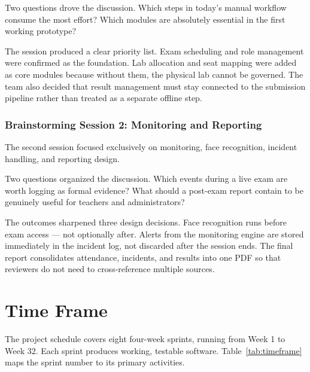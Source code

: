 Two questions drove the discussion. Which steps in today's manual workflow consume the most effort? Which modules are absolutely essential in the first working prototype?

The session produced a clear priority list. Exam scheduling and role management were confirmed as the foundation. Lab allocation and seat mapping were added as core modules because without them, the physical lab cannot be governed. The team also decided that result management must stay connected to the submission pipeline rather than treated as a separate offline step.

\subsubsection{Brainstorming Session 2: Monitoring and Reporting}
The second session focused exclusively on monitoring, face recognition, incident handling, and reporting design.

Two questions organized the discussion. Which events during a live exam are worth logging as formal evidence? What should a post-exam report contain to be genuinely useful for teachers and administrators?

The outcomes sharpened three design decisions. Face recognition runs before exam access — not optionally after. Alerts from the monitoring engine are stored immediately in the incident log, not discarded after the session ends. The final report consolidates attendance, incidents, and results into one PDF so that reviewers do not need to cross-reference multiple sources.

\section{Time Frame}

The project schedule covers eight four-week sprints, running from Week 1 to Week 32. Each sprint produces working, testable software. Table~\ref{tab:timeframe} maps the sprint number to its primary activities.

